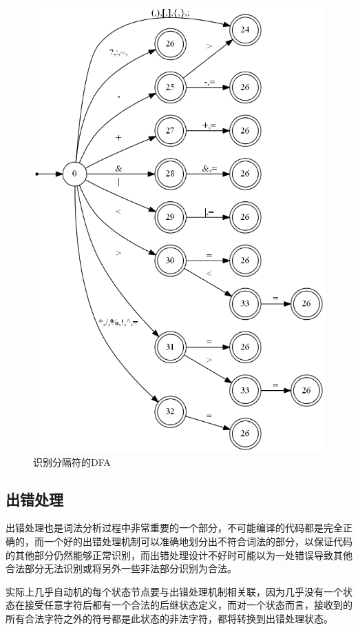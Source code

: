 \documentclass[UTF8, twoside, titlepage]{ctexart}
\begin{document}
\begin{figure}[htbp]
	\centering
	\includegraphics[scale=0.5]{images/operator.png}
	\caption{识别分隔符的DFA}
	\label{fig:operator}
\end{figure}

\subsection{出错处理}
出错处理也是词法分析过程中非常重要的一个部分，不可能编译的代码都是完全正确的，而一个好的出错处理机制可以准确地划分出不符合词法的部分，以保证代码的其他部分仍然能够正常识别，而出错处理设计不好时可能以为一处错误导致其他合法部分无法识别或将另外一些非法部分识别为合法。

实际上几乎自动机的每个状态节点要与出错处理机制相关联，因为几乎没有一个状态在接受任意字符后都有一个合法的后继状态定义，而对一个状态而言，接收到的所有合法字符之外的符号都是此状态的非法字符，都将转换到出错处理状态。
\end{document}
